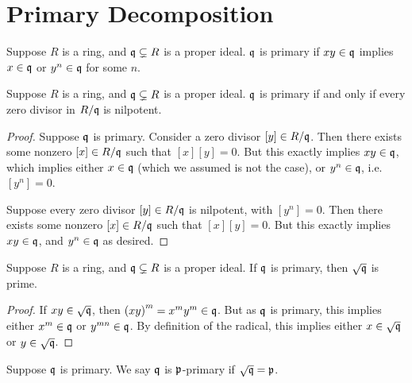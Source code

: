 \section{Primary Decomposition}

\begin{definition}
    Suppose \(R\) is a ring, and \(\mathfrak{q} \subsetneq R\) is a proper ideal.
    \(\mathfrak{q}\) is primary if \(xy \in \mathfrak{q}\) implies \(x \in \mathfrak{q}\) or \(y^n \in \mathfrak{q}\) for some \(n\).
\end{definition}
\begin{proposition}\label{prop:primary-zero-div-nilpotent}
    Suppose \(R\) is a ring, and \(\mathfrak{q} \subsetneq R\) is a proper ideal.
    \(\mathfrak{q}\) is primary if and only if every zero divisor in \(R/\mathfrak{q}\) is nilpotent.
\end{proposition}
\begin{proof}
    Suppose \(\mathfrak{q}\) is primary.
    Consider a zero divisor \([y] \in R/\mathfrak{q}\).
    Then there exists some nonzero \([x] \in R/\mathfrak{q}\) such that \([x][y] = 0\).
    But this exactly implies \(xy \in \mathfrak{q}\),
    which implies either \(x \in \mathfrak{q}\) (which we assumed is not the case),
    or \(y^n \in \mathfrak{q}\), i.e.\ \([y^n] = 0\).
    
    Suppose every zero divisor \([y] \in R/\mathfrak{q}\) is nilpotent, with \([y^n] = 0\).
    Then there exists some nonzero \([x] \in R/\mathfrak{q}\) such that \([x][y] = 0\).
    But this exactly implies \(xy \in \mathfrak{q}\),
    and \(y^n \in \mathfrak{q}\) as desired.
\end{proof}
\begin{theorem}
    Suppose \(R\) is a ring, and \(\mathfrak{q} \subsetneq R\) is a proper ideal.
    If \(\mathfrak{q}\) is primary, then \(\sqrt{\mathfrak{q}}\) is prime.
\end{theorem}
\begin{proof}
    If \(xy \in \sqrt{\mathfrak{q}}\),
    then \({(xy)}^m = x^m y^m \in \mathfrak{q}\).
    But as \(\mathfrak{q}\) is primary, this implies either \(x^m \in \mathfrak{q}\) or \(y^{mn} \in \mathfrak{q}\).
    By definition of the radical, this implies either \(x \in \sqrt{\mathfrak{q}}\) or \(y \in \sqrt{\mathfrak{q}}\).
\end{proof}
\begin{definition}
    Suppose \(\mathfrak{q}\) is primary.
    We say \(\mathfrak{q}\) is \(\mathfrak{p}\)-primary if \(\sqrt{\mathfrak{q}} = \mathfrak{p}\).
\end{definition}

